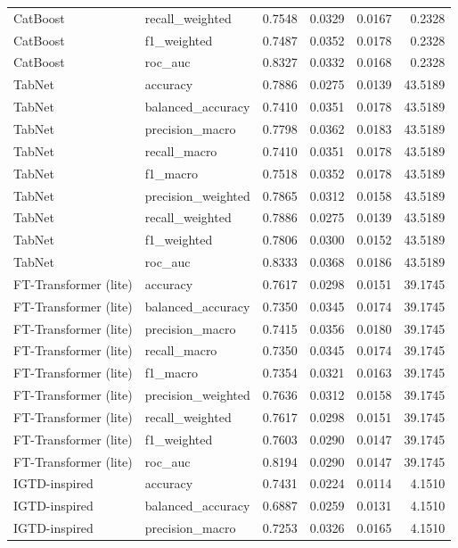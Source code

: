\begin{tabular}{llrrrr}
CatBoost & recall_weighted & 0.7548 & 0.0329 & 0.0167 & 0.2328 \\
CatBoost & f1_weighted & 0.7487 & 0.0352 & 0.0178 & 0.2328 \\
CatBoost & roc_auc & 0.8327 & 0.0332 & 0.0168 & 0.2328 \\
TabNet & accuracy & 0.7886 & 0.0275 & 0.0139 & 43.5189 \\
TabNet & balanced_accuracy & 0.7410 & 0.0351 & 0.0178 & 43.5189 \\
TabNet & precision_macro & 0.7798 & 0.0362 & 0.0183 & 43.5189 \\
TabNet & recall_macro & 0.7410 & 0.0351 & 0.0178 & 43.5189 \\
TabNet & f1_macro & 0.7518 & 0.0352 & 0.0178 & 43.5189 \\
TabNet & precision_weighted & 0.7865 & 0.0312 & 0.0158 & 43.5189 \\
TabNet & recall_weighted & 0.7886 & 0.0275 & 0.0139 & 43.5189 \\
TabNet & f1_weighted & 0.7806 & 0.0300 & 0.0152 & 43.5189 \\
TabNet & roc_auc & 0.8333 & 0.0368 & 0.0186 & 43.5189 \\
FT-Transformer (lite) & accuracy & 0.7617 & 0.0298 & 0.0151 & 39.1745 \\
FT-Transformer (lite) & balanced_accuracy & 0.7350 & 0.0345 & 0.0174 & 39.1745 \\
FT-Transformer (lite) & precision_macro & 0.7415 & 0.0356 & 0.0180 & 39.1745 \\
FT-Transformer (lite) & recall_macro & 0.7350 & 0.0345 & 0.0174 & 39.1745 \\
FT-Transformer (lite) & f1_macro & 0.7354 & 0.0321 & 0.0163 & 39.1745 \\
FT-Transformer (lite) & precision_weighted & 0.7636 & 0.0312 & 0.0158 & 39.1745 \\
FT-Transformer (lite) & recall_weighted & 0.7617 & 0.0298 & 0.0151 & 39.1745 \\
FT-Transformer (lite) & f1_weighted & 0.7603 & 0.0290 & 0.0147 & 39.1745 \\
FT-Transformer (lite) & roc_auc & 0.8194 & 0.0290 & 0.0147 & 39.1745 \\
IGTD-inspired & accuracy & 0.7431 & 0.0224 & 0.0114 & 4.1510 \\
IGTD-inspired & balanced_accuracy & 0.6887 & 0.0259 & 0.0131 & 4.1510 \\
IGTD-inspired & precision_macro & 0.7253 & 0.0326 & 0.0165 & 4.1510 \\

\end{tabular}
